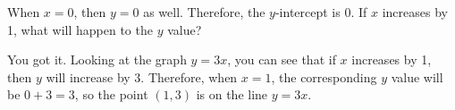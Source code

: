 \documentclass{ximera}
\begin{document}
\begin{exercise}
\begin{example}
When $x=0$, then $y=0$ as well.  Therefore, the $y$-intercept is $0$.  If $x$ increases by 1, what will happen to the $y$ value?  

\begin{multipleChoice}
\end{multipleChoice}

\begin{explanation}
You got it.  Looking at the graph $y=3x$, you can see that if $x$ increases by 1, then $y$ will increase by $3$.  Therefore, when $x=1$, the corresponding $y$ value will be $0+3 = 3$, so the point $(1,3)$ is on the line $y=3x$. 
\end{explanation}



\end{example}

\end{exercise}
\end{document}
